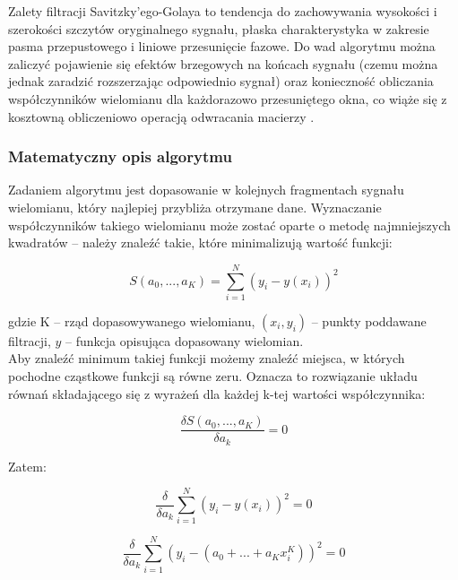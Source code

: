 \documentclass[a4paper]{article}
\begin{document}
Zalety filtracji Savitzky'ego-Golaya to tendencja do zachowywania wysokości i szerokości szczytów oryginalnego sygnału, płaska charakterystyka w zakresie pasma przepustowego i liniowe przesunięcie fazowe. Do wad algorytmu można zaliczyć pojawienie się efektów brzegowych na końcach sygnału (czemu można jednak zaradzić rozszerzając odpowiednio sygnał) oraz konieczność obliczania współczynników wielomianu dla każdorazowo przesuniętego okna, co wiąże się z kosztowną obliczeniowo operacją odwracania macierzy \cite{per-olof}.

\subsubsection {Matematyczny opis algorytmu}

Zadaniem algorytmu jest dopasowanie w kolejnych fragmentach sygnału wielomianu, który najlepiej przybliża otrzymane dane. Wyznaczanie współczynników takiego wielomianu może zostać oparte o metodę najmniejszych kwadratów \cite{least-squares} -- należy znaleźć takie, które minimalizują wartość funkcji:

\begin{equation} \label{eq1}
S(a_0, ..., a_K) = \sum_{i=1}^N \left( y_i - y(x_i) \right)^2
\end{equation}

gdzie K -- rząd dopasowywanego wielomianu, $(x_i, y_i)$ -- punkty poddawane filtracji, $y$ -- funkcja opisująca dopasowany wielomian.\\

Aby znaleźć minimum takiej funkcji możemy znaleźć miejsca, w których pochodne cząstkowe funkcji są równe zeru. Oznacza to rozwiązanie układu równań składającego się z wyrażeń dla każdej k-tej wartości współczynnika:

\begin{equation}
\frac{\delta S(a_0, ..., a_K)}{\delta a_k} = 0
\end{equation}

Zatem:

\begin{equation}
\frac{\delta}{\delta a_k} \sum_{i=1}^N \left( y_i - y(x_i) \right)^2 = 0
\end{equation}

\begin{equation}
\frac{\delta}{\delta a_k}\sum_{i=1}^N \left( y_i - \left(a _0 + ... + a_K x_i^K \right)\right)^2 = 0
\end{equation}
\end{document}
